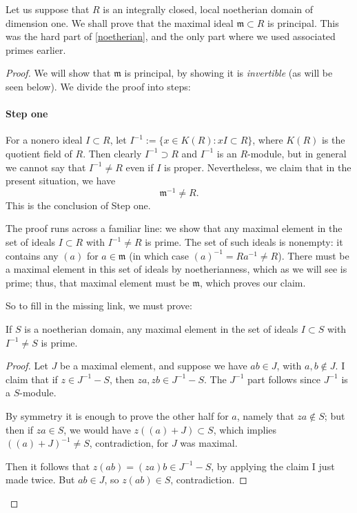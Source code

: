 Let us suppose that $R$ is an integrally closed, local noetherian domain of
dimension one. We shall prove that the maximal ideal $\mathfrak{m} \subset R$
is principal. This was the hard part of \cref{noetherian}, and the only part
where we used associated primes earlier.
\begin{proof}
We will show that $\mathfrak{m}$ is principal, by showing it is \emph{invertible} (as will be seen below).   We divide the proof into steps:

\paragraph{Step one}
For a nonero ideal $I \subset R$, let $I^{-1} := \{ x \in K(R): xI \subset R \}$,
where $K(R)$ is the quotient field of $R$.  Then clearly $I^{-1} \supset R$
and $I^{-1}$ is an $R$-module, but in general we cannot say that $I^{-1} \neq
R$ even if $I$ is proper.  
Nevertheless, we claim that in the present situation, we have  \[
{\mathfrak{m}^{-1} \neq R.}\] This is the conclusion of Step one.

The proof runs across a familiar line: we show that any maximal element in the
set of ideals $I \subset R$ with $I^{-1} \neq R$ is prime. 
The set of such ideals is nonempty: it contains   any $(a)$ for $a \in \mathfrak{m}$ (in which case $(a)^{-1} = Ra^{-1} \neq R$).  
There must be a maximal element in this set of ideals by noetherianness, which
as we will see is prime; thus,  that maximal element must be $\mathfrak{m}$, which proves our claim.

So to fill in the missing link, we must prove:
\begin{lemma} If $S$ is a noetherian domain, any maximal element in the set of ideals $I \subset S$ with $I^{-1} \neq S$ is prime.
\end{lemma}

\begin{proof}
Let $J$ be a maximal element, and suppose we have $ab \in J$, with  $a,b \notin J$.  I claim that if $z \in J^{-1} - S$, then $za, zb \in J^{-1} - S$.  The $J^{-1}$ part follows since $J^{-1}$ is a $S$-module.

By symmetry it is enough to prove the other half for $a$, namely that $za \notin
S$; but then if $za \in S$, we would have $z( (a) + J ) \subset S$, which implies $ ( (a) + J)^{-1} \neq S$, contradiction, for $J$ was maximal.

Then it follows that $z(ab) = (za) b \in J^{-1} - S$, by applying the claim I just made twice.  But $ab \in J$, so $z(ab) \in S$, contradiction.
\end{proof}




\end{proof}
